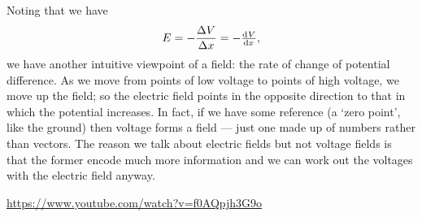 \documentclass[a4paper]{amsbook}
\begin{document}
Noting that we have
\begin{equation}
  E = -\frac{\Delta V}{\Delta x} = -\od{V}{x},
\end{equation}
we have another intuitive viewpoint of a field: the rate of change of potential difference. As we move from points of low voltage
to points of high voltage, we move up the field; so the electric field points in the opposite direction to that in which the potential
increases. In fact, if we have some reference (a `zero point', like the ground) then voltage forms a field --- just one made up of
numbers rather than vectors. The reason we talk about electric fields but not voltage fields is that the former encode much more information
and we can work out the voltages with the electric field anyway.

\begin{center}
\begin{tcolorbox}[width=0.8\textwidth,colback={red},title={\textbf{Go and watch...}},colbacktitle=yellow,coltitle=blue]
  \textcolor{white}{\url{https://www.youtube.com/watch?v=f0AQpjh3G9o}}
\end{tcolorbox}
\end{center}
\end{document}
